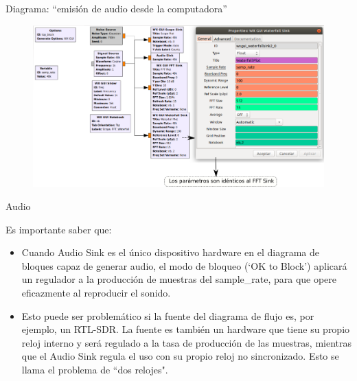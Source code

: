 \begin{frame}{Diagrama:  ``emisión de audio desde la computadora''}

\begin{figure}

\begin{center}
\vspace{-8mm}
\includegraphics[width=1.05\textwidth]{parte1/lab3/pdf/lab3_4.pdf}
\end{center}
\end{figure}

\end{frame}

\begin{frame}{Audio}

Es importante saber que:\\
\begin{itemize}
    \item
    {Cuando Audio Sink es el único dispositivo hardware en el diagrama de bloques capaz de generar audio, el modo de bloqueo (‘OK to Block’) aplicará un regulador a la producción de muestras del sample\_rate, para que opere eficazmente al reproducir el sonido\cite{Seeber2014}.}
    \item
    {Esto puede ser problemático si la fuente del diagrama de flujo es, por ejemplo, un RTL-SDR. La fuente es también un hardware que tiene su propio reloj interno y será regulado a la tasa de producción de las muestras, mientras que el Audio Sink regula el uso con su propio reloj no sincronizado. Esto se llama el problema de “dos relojes".}
\end{itemize}
\end{frame}

